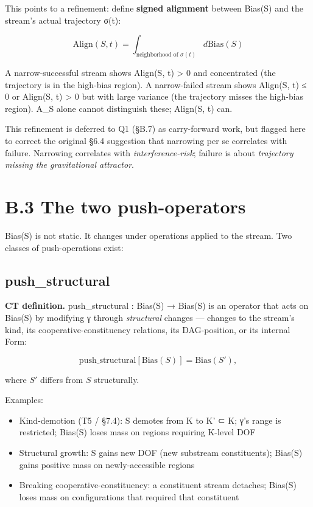 \documentclass[11pt, openany]{book}
\newcommand{\sectionbreak}{\clearpage}
\begin{document}
This points to a refinement: define \textbf{signed alignment} between Bias(S) and the stream's actual trajectory σ(t):

$$\text{Align}(S, t) = \int_{\text{neighborhood of } \sigma(t)} d\text{Bias}(S)$$

A narrow-successful stream shows Align(S, t) > 0 and concentrated (the trajectory is in the high-bias region). A narrow-failed stream shows Align(S, t) ≤ 0 or Align(S, t) > 0 but with large variance (the trajectory misses the high-bias region). A\_\allowbreak{}S alone cannot distinguish these; Align(S, t) can.

This refinement is deferred to Q1 (§B.7) as carry-forward work, but flagged here to correct the original §6.4 suggestion that narrowing per se correlates with failure. Narrowing correlates with \textit{interference-risk}; failure is about \textit{trajectory missing the gravitational attractor}.

\sectionbreak

\section{B.3 The two push-operators}

Bias(S) is not static. It changes under operations applied to the stream. Two classes of push-operations exist:

\subsection{push\_\allowbreak{}structural}

\textbf{CT definition.} push\_\allowbreak{}structural : Bias(S) → Bias(S) is an operator that acts on Bias(S) by modifying γ through \textit{structural} changes --- changes to the stream's kind, its cooperative-constituency relations, its DAG-position, or its internal Form:

$$\text{push\_structural}[\text{Bias}(S)] = \text{Bias}(S'),$$

where $S'$ differs from $S$ structurally.

Examples:
\begin{itemize}
\item Kind-demotion (T5 / §7.4): S demotes from K to K' ⊂ K; γ's range is restricted; Bias(S) loses mass on regions requiring K-level DOF
\item Structural growth: S gains new DOF (new substream constituents); Bias(S) gains positive mass on newly-accessible regions
\item Breaking cooperative-constituency: a constituent stream detaches; Bias(S) loses mass on configurations that required that constituent
\end{itemize}
\end{document}
